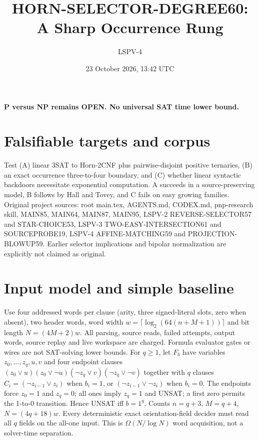 \documentclass[11pt]{article}
\title{HORN-SELECTOR-DEGREE60: A Sharp Occurrence Rung}
\author{LSPV-4}
\date{23 October 2026, 13:42 UTC}
\begin{document}
\maketitle
\begin{center}\textbf{P versus NP remains OPEN. No universal SAT time lower bound.}\end{center}
\section{Falsifiable targets and corpus}
Test (A) linear 3SAT to Horn-2CNF plus pairwise-disjoint positive ternaries, (B) an exact occurrence three-to-four boundary, and (C) whether linear syntactic backdoors necessitate exponential computation. A succeeds in a source-preserving model, B follows by Hall and Tovey, and C fails on easy growing families.
Original project sources: root main.tex, AGENTS.md, CODEX.md, pnp-research skill, MAIN85, MAIN64, MAIN87, MAIN95, LSPV-2 REVERSE-SELECTOR57 and STAR-CHOICE53, LSPV-3 TWO-EASY-INTERSECTION61 and SOURCEPROBE19, LSPV-4 AFFINE-MATCHING59 and PROJECTION-BLOWUP59. Earlier selector implications and bipolar normalization are explicitly not claimed as original.
\section{Input model and simple baseline}
Use four addressed words per clause (arity, three signed-literal slots, zero when absent), two header words, word width $w=\lceil\log_2(64(n+M+1))\rceil$ and bit length $N=(4M+2)w$. All parsing, source reads, failed attempts, output words, source replay and live workspace are charged. Formula evaluator gates or wires are not SAT-solving lower bounds.
For $q\ge1$, let $F_b$ have variables $z_0,\ldots,z_q,u,v$ and four endpoint clauses $(z_0\vee u)(z_0\vee\neg u)(\neg z_q\vee v)(\neg z_q\vee\neg v)$ together with $q$ clauses $C_i=(\neg z_{i-1}\vee z_i)$ when $b_i=1$, or $(\neg z_{i-1}\vee\neg z_i)$ when $b_i=0$. The endpoints force $z_0=1$ and $z_q=0$; all ones imply $z_q=1$ and UNSAT; a first zero permits the 1-to-0 transition. Hence UNSAT iff $b=1^q$. Counts $n=q+3$, $M=q+4$, $N=(4q+18)w$. Every deterministic exact orientation-field decider must read all $q$ fields on the all-one input. This is $\Omega(N/\log N)$ word acquisition, not a solver-time separation.
\end{document}
